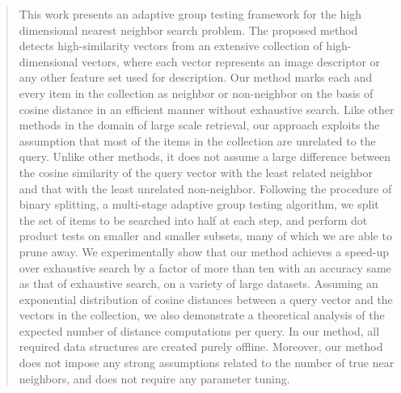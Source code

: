 \documentclass[sigconf, anonymous, review]{acmart}
\begin{document}
\begin{abstract}
This work presents an adaptive group testing framework for the high dimensional nearest neighbor search problem. The proposed method detects high-similarity vectors from an extensive collection of high-dimensional vectors, where each vector represents an image descriptor or any other feature set used for description. Our method marks each and every item in the collection as neighbor or non-neighbor on the basis of cosine distance in an efficient manner without exhaustive search. Like other methods in the domain of large scale retrieval, our approach exploits the assumption that most of the items in the collection are unrelated to the query. Unlike other methods, it does not assume a large difference between the cosine similarity of the query vector with the least related neighbor and that with the least unrelated non-neighbor. Following the procedure of binary splitting, a multi-stage adaptive group testing algorithm, we split the set of items to be searched into half at each step, and perform dot product tests on smaller and smaller subsets, many of which we are able to prune away. We experimentally show that our method achieves a speed-up over exhaustive search by a factor of more than ten with an accuracy same as that of exhaustive search, on a variety of large datasets. Assuming an exponential distribution of cosine distances between a query vector and the vectors in the collection, we also demonstrate a theoretical analysis of the expected number of distance computations per query. 
In our method, all required data structures are created purely offline. Moreover, our method does not impose any strong assumptions related to the number of true near neighbors, and does not require any parameter tuning. 
\end{abstract}



\end{document}
